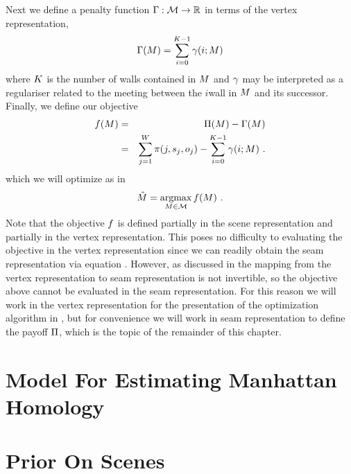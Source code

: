 Next we define a penalty function
$\ScenePenalty:\SetOfScenes\Mapto\Reals$ in terms of the vertex
representation,
\begin{equation}
  \label{eq:scene-penalty}
  \ScenePenalty(\Scene) = 
  \sum_{i=0}^{\NumWalls-1} \CornerPenalty(i;\Scene)
\end{equation}
where $\NumWalls$ is the number of walls contained in $\Scene$ and
$\CornerPenalty$ may be interpreted as a regulariser related to the
meeting between the $i$\th wall in $\Scene$ and its
successor. Finally, we define our objective
\begin{eqnarray}
  \label{eq:scene-objective}
  \Objective(\Scene) &=&
  \ScenePayoff(\Scene) - \ScenePenalty(\Scene)\\
  &=&
  \sum_{j=1}^{\Width} \PixelPayoff(j,\seam_j,\WallOrient_j) -
  \sum_{i=0}^{\NumWalls-1} \CornerPenalty(i;\Scene) ~.
\end{eqnarray}
which we will optimize as in
\begin{equation}
  \label{eq:opt-scene}
  \EstimatedScene = \argmax_{\Scene\in\SetOfScenes}\limits \Objective(\Scene) ~.
\end{equation}
Note that the objective $\Objective$ is defined partially in the scene
representation and partially in the vertex representation. This poses
no difficulty to evaluating the objective in the vertex representation
since we can readily obtain the seam representation via equation
. However, as discussed in
 the mapping from the vertex
representation to seam representation is not invertible, so the
objective above cannot be evaluated in the seam representation. For
this reason we will work in the vertex representation for the
presentation of the optimization algorithm in , but
for convenience we will work in seam representation to define the
payoff $\ScenePayoff$, which is the topic of the remainder of this
chapter.

\section{Model For Estimating Manhattan Homology}

\section{Prior On Scenes}


